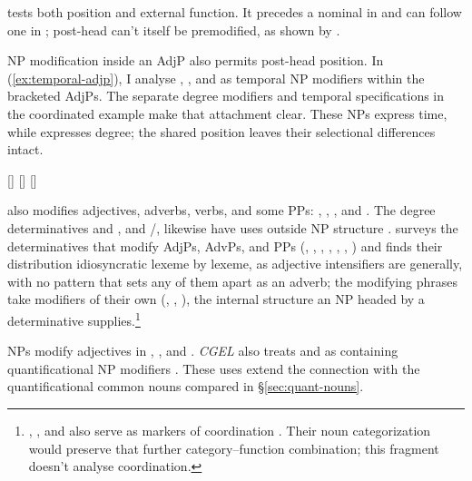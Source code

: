 \documentclass[12pt]{article}
\begin{document}
 tests both position and external function. It precedes a nominal in  and can follow one in ; post-head  can't itself be premodified, as shown by  \citep[396--397, 445]{huddleston2002}.

NP modification inside an AdjP also permits post-head position. In (\ref{ex:temporal-adjp}), I analyse , , and  as temporal NP modifiers within the bracketed AdjPs. The separate degree modifiers and temporal specifications in the coordinated example make that attachment clear. These NPs express time, while  expresses degree; the shared position leaves their selectional differences intact.

\ea\label{ex:temporal-adjp}
\ea {} [] 
\ex {} []  [] 
\z\z

 also modifies adjectives, adverbs, verbs, and some PPs: , , , and  \citep[396--397]{huddleston2002}. The degree determinatives  and , and /, likewise have uses outside NP structure \citep[390, 395--397]{huddleston2002}. \textcite{reynolds2024why} surveys the determinatives that modify AdjPs, AdvPs, and PPs (, , , , , , ) and finds their distribution idiosyncratic lexeme by lexeme, as adjective intensifiers are generally, with no pattern that sets any of them apart as an adverb; the modifying phrases take modifiers of their own (, , ), the internal structure an NP headed by a determinative supplies.\footnote{, , and  also serve as markers of coordination \citep[1305, 1308]{huddleston2002}. Their noun categorization would preserve that further category--function combination; this fragment doesn't analyse coordination.}

NPs modify adjectives in , , and . \textit{CGEL} also treats  and  as containing quantificational NP modifiers \citep[549--550]{huddleston2002}. These uses extend the connection with the quantificational common nouns compared in §\ref{sec:quant-nouns}.
\end{document}

